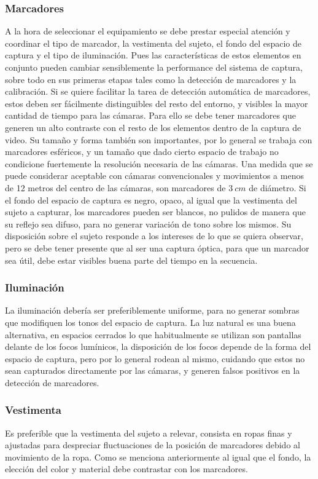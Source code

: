 \subsubsection{Marcadores}
A la hora de seleccionar el equipamiento se debe prestar especial atención y coordinar el tipo de marcador, la vestimenta del sujeto, el fondo del espacio de captura y el tipo de iluminación. Pues las características de estos elementos en conjunto pueden cambiar sensiblemente la performance del sistema de captura, sobre todo en sus primeras etapas tales como la detección de marcadores y la  calibración.
Si se quiere facilitar la tarea de detección automática de marcadores, estos deben ser fácilmente distinguibles del resto del entorno, y visibles la mayor cantidad de tiempo para las cámaras. Para ello se debe tener marcadores que generen un alto contraste con el resto de los elementos dentro de la captura de video. 
Su tamaño y forma también son importantes, por lo general se trabaja con marcadores esféricos, y un tamaño que dado cierto espacio de trabajo no condicione fuertemente la resolución necesaria de las cámaras. Una medida que se puede considerar aceptable con cámaras convencionales y movimientos a menos de 12 metros del centro de las cámaras, son marcadores de $3~cm$ de diámetro.  
Si el fondo del espacio de captura es negro, opaco, al igual que la vestimenta del sujeto a capturar, los marcadores pueden ser blancos, no pulidos de manera que su reflejo sea difuso, para no generar variación de tono sobre los mismos. 
Su disposición sobre el sujeto responde a los intereses de lo que se quiera observar, pero se debe tener presente que al ser una captura óptica, para que un marcador sea útil, debe estar visibles buena parte del tiempo en la secuencia.

\subsubsection{Iluminación}
La iluminación debería ser preferiblemente uniforme, para no generar sombras que modifiquen los tonos del espacio de captura. La luz natural es una buena alternativa, en espacios cerrados lo que habitualmente se utilizan son pantallas delante de los focos lumínicos, la disposición de los focos depende de la forma del espacio de captura, pero por lo general rodean al mismo, cuidando que estos no sean capturados directamente por las cámaras, y generen falsos positivos en la detección de marcadores.

\subsubsection{Vestimenta}
Es preferible que la vestimenta del sujeto a relevar, consista en ropas finas y ajustadas para despreciar fluctuaciones de la posición de marcadores debido al movimiento de la ropa. Como se menciona anteriormente al igual que el fondo, la elección del color y material debe contrastar con los marcadores.

